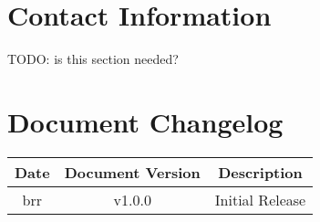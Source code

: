 \documentclass[12pt]{article}
\begin{document}
\section{Contact Information}
TODO: is this section needed?
\pagebreak
\section{Document Changelog}
\begin{center}
\begin{tabular}{|c|c|c|}
    \hline
    \textbf{Date} & \textbf{Document Version} & \textbf{Description} \\
    \hline
    brr & v1.0.0 & Initial Release \\
    \hline
\end{tabular}
\end{center}
\end{document}
